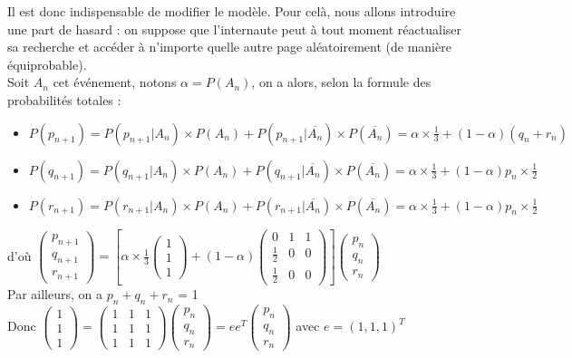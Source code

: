 \documentclass[a4paper,10pt]{report}
\begin{document}
\newpage
\indent Il est donc indispensable de modifier le modèle. Pour celà, nous allons introduire une part de hasard : on suppose que l'internaute peut à tout moment réactualiser sa recherche et accéder à n'importe quelle autre page aléatoirement (de manière équiprobable).\\
Soit $A_n$ cet événement, notons $\alpha =P(A_n)$, on a alors, selon la formule des probabilités totales :
\begin{itemize}
\item $P(p_{n+1})=P(p_{n+1}|A_n)\times P(A_n) + P(p_{n+1}|\overline{A_n})\times P(\overline{A_n}) = \alpha \times \frac{1}{3} + (1-\alpha)(q_n+r_n)$
\item $P(q_{n+1})=P(q_{n+1}|A_n)\times P(A_n) + P(q_{n+1}|\overline{A_n})\times P(\overline{A_n}) = \alpha \times \frac{1}{3} + (1-\alpha) p_n\times \frac{1}{2}$
\item $P(r_{n+1})=P(r_{n+1}|A_n)\times P(A_n) + P(r_{n+1}|\overline{A_n})\times P(\overline{A_n}) = \alpha \times \frac{1}{3} + (1-\alpha) p_n\times \frac{1}{2}$
\end{itemize}
d'où $\left( \begin{array}{c} p_{n+1} \\ q_{n+1} \\ r_{n+1} \end{array} \right)= \left[ \alpha \times \frac{1}{3} \left( \begin{array}{c} 1 \\ 1 \\ 1 \end{array} \right) + (1-\alpha) \left( \begin{array}{ccc} 0 & 1 & 1 \\ \frac{1}{2} & 0 & 0 \\ \frac{1}{2} & 0 & 0 \end{array} \right) \right] \left( \begin{array}{c} p_{n} \\ q_{n} \\ r_{n} \end{array} \right)$\\

\noindent Par ailleurs, on a $p_n+q_n+r_n$ = 1\\
Donc $\left( \begin{array}{c} 1 \\ 1 \\ 1 \end{array} \right) =
\left( \begin{array}{ccc} 1 & 1 & 1 \\ 1 & 1 & 1 \\ 1 & 1 & 1 \end{array} \right)\left( \begin{array}{c} p_{n} \\ q_{n} \\ r_{n} \end{array} \right)
= ee^T\left( \begin{array}{c} p_{n} \\ q_{n} \\ r_{n} \end{array} \right)$ avec $e=(1,1,1)^T$\\ \\
\end{document}
